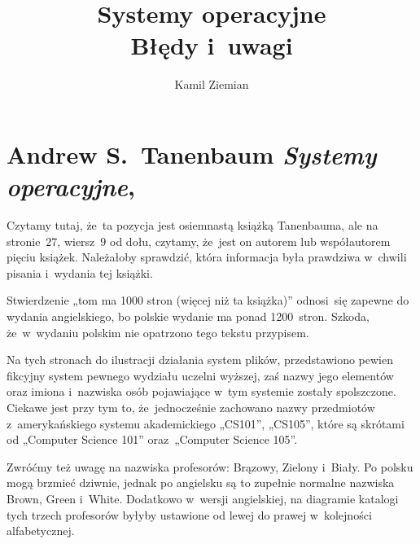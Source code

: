 \documentclass[a4paper,11pt]{article}
\title{Systemy operacyjne \\
  {\Large Błędy i~uwagi}}
\author{Kamil Ziemian \\
  \email}
\numberwithin{equation}{section}
\begin{document}





\maketitle





\section{Andrew S.~Tanenbaum \textit{Systemy operacyjne},
  \parencite{Tanenbaum-Systemy-operacyjne-Wydanie-III-Pub-2013}}

\label{sec:Tanenbaum-Systemy-operacyjne}



\noindent
{} Czytamy tutaj, że~ta pozycja jest osiemnastą
książką Tanenbauma, ale na stronie~$27$, wiersz~$9$ od dołu, czytamy,
że~jest on autorem lub współautorem pięciu książek. Należałoby sprawdzić,
która informacja była prawdziwa w~chwili pisania i~wydania tej książki.

\VerSpaceFour





\noindent
{} Stwierdzenie „tom ma 1000 stron (więcej niż ta
książka)” odnosi~się zapewne do wydania angielskiego, bo polskie wydanie ma
ponad 1200~stron. Szkoda, że~w~wydaniu polskim nie opatrzono tego tekstu
przypisem.

\VerSpaceFour





\noindent
{} Na tych stronach do ilustracji działania system plików,
przedstawiono pewien fikcyjny system pewnego wydziału uczelni wyższej, zaś
nazwy jego elementów oraz imiona i~nazwiska osób pojawiające w~tym systemie
zostały spolszczone. Ciekawe jest przy tym to, że~jednocześnie zachowano
nazwy przedmiotów z~amerykańskiego systemu akademickiego „CS101”, „CS105”,
które są skrótami od „Computer Science 101” oraz~„Computer Science 105”.

Zwróćmy też uwagę na nazwiska profesorów: Brązowy, Zielony i~Biały. Po
polsku mogą brzmieć dziwnie, jednak po angielsku są to zupełnie normalne
nazwiska Brown, Green i~White. Dodatkowo w~wersji angielskiej, na diagramie
katalogi tych trzech profesorów byłyby ustawione od lewej do prawej
w~kolejności alfabetycznej.
\end{document}
